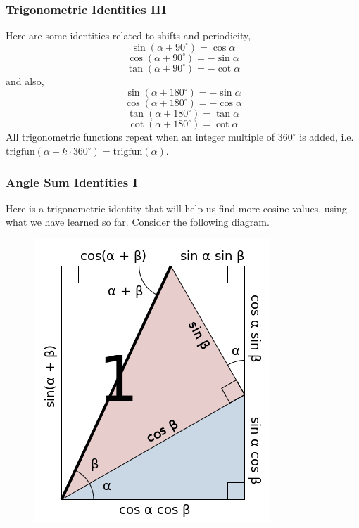 \documentclass[xcolor=dvipsnames]{beamer}
\begin{document}
\begin{frame}
  \frametitle{Trigonometric Identities III}
Here are some identities related to shifts and periodicity,
\begin{equation}
  \label{eq:owoofaiw}
  \sin(\alpha+90^{\circ})=\cos\alpha
\end{equation}
\begin{equation}
  \label{eq:ohbixiem}
  \cos(\alpha+90^{\circ})=-\sin\alpha
\end{equation}
\begin{equation}
  \label{eq:kaitohbu}
  \tan(\alpha+90^{\circ})=-\cot\alpha
\end{equation}
and also,
\begin{equation}
  \label{eq:jahpeexu}
  \sin(\alpha+180^{\circ})=-\sin\alpha
\end{equation}
\begin{equation}
  \label{eq:aephuemo}
  \cos(\alpha+180^{\circ})=-\cos\alpha
\end{equation}
\begin{equation}
  \label{eq:xaiyahcu}
  \tan(\alpha+180^{\circ})=\tan\alpha
\end{equation}
\begin{equation}
  \label{eq:aitahwae}
  \cot(\alpha+180^{\circ})=\cot\alpha
\end{equation}
All trigonometric functions repeat when an integer multiple of
$360^{\circ}$ is added, i.e.\
$\mbox{trigfun}(\alpha+k\cdot360^{\circ})=\mbox{trigfun}(\alpha)$.
\end{frame}

\begin{frame}
  \frametitle{Angle Sum Identities I}
  Here is a trigonometric identity that will help us find more cosine
  values, using what we have learned so far. Consider the following
  diagram.
  \begin{figure}[h]
    \includegraphics[scale=.45]{./anglesum.png}
  \end{figure}
\end{frame}
\end{document}
